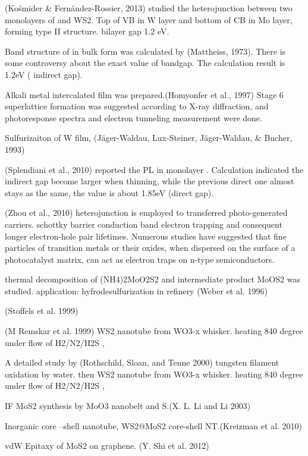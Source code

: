 (Kośmider \& Fernández-Rossier, 2013) studied the heterojunction between two monolayers of  and WS2. Top of VB in W layer and bottom of CB in Mo layer, forming type II structure. bilayer gap 1.2 eV.


Band structure  of  in bulk form was calculated by (Mattheiss, 1973). There is some controversy about the exact value of bandgap. The calculation result is 1.2eV ( indirect gap).\cite{Mattheiss1973}

Alkali metal intercalated  film was prepared.(Homyonfer et al., 1997) Stage 6 superlattice formation was suggested according to X-ray diffraction, and photoresponse spectra and electron tunneling measurement were done.

Sulfurizaiton of W film, (Jäger-Waldau, Lux-Steiner, Jäger-Waldau, \& Bucher, 1993)

(Splendiani et al., 2010) reported the PL in monolayer .  Calculation indicated the indirect gap become larger when thinning, while the previous direct one almost stays as the same, the value is about 1.85eV (direct gap).\cite{Splendiani2010}

(Zhou et al., 2010) heterojunction is employed to transferred photo-generated carriers. schottky barrier conduction band electron trapping and consequent longer electron-hole pair lifetimes. Numerous studies have suggested that fine particles of transition metals or their oxides, when dispersed on the surface of a photocatalyst matrix, can act as electron traps on n-type semiconductors.

thermal decomposition of (NH4)2MoO2S2 and intermediate product MoOS2 was studied. application: hyfrodesulfurization in refinery (Weber et al. 1996) \cite{Weber1996}

 (Stoffels et al. 1999)

(M Remskar et al. 1999) WS2 nanotube from WO3-x whisker. heating 840 degree under flow of H2/N2/H2S ,

A detailed study by (Rothschild, Sloan, and Tenne 2000) tungsten filament oxidation by water. then WS2 nanotube from WO3-x whisker. heating 840 degree under flow of H2/N2/H2S ,

IF MoS2 synthesis by MoO3 nanobelt and S.(X. L. Li and Li 2003)

Inorganic core –shell nanotube, WS2@MoS2 core-shell NT.(Kreizman et al. 2010)

vdW Epitaxy of MoS2 on graphene. (Y. Shi et al. 2012)

